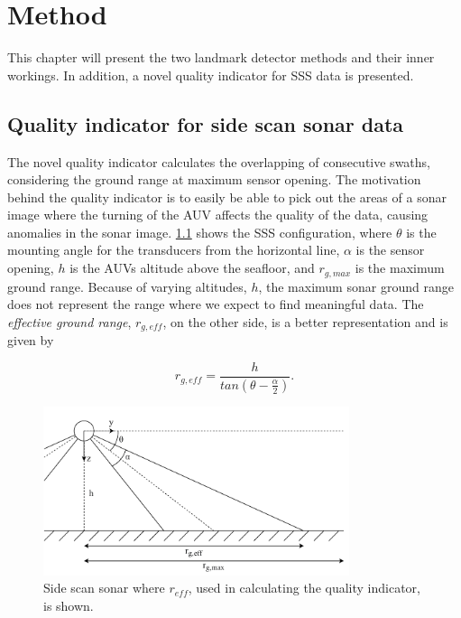 \chapter{Method}

This chapter will present the two landmark detector methods and their inner workings. In addition, a novel quality indicator for SSS data is presented.

\section{Quality indicator for side scan sonar data}

The novel quality indicator calculates the overlapping of consecutive swaths, considering the ground range at maximum sensor opening. The motivation behind the quality indicator is to easily be able to pick out the areas of a sonar image where the turning of the AUV affects the quality of the data, causing anomalies in the sonar image. \cref{fig:r_eff} shows the SSS configuration, where $\theta$ is the mounting angle for the transducers from the horizontal line, $\alpha$ is the sensor opening, $h$ is the AUVs altitude above the seafloor, and $r_{g, max}$ is the maximum ground range. Because of varying altitudes, $h$, the maximum sonar ground range does not represent the range where we expect to find meaningful data. The \textit{effective ground range}, $r_{g, eff}$, on the other side, is a better representation and is given by

\begin{equation}
    r_{g,eff} = \frac{h}{tan(\theta - \frac{\alpha}{2})}.
    \label{eq:r_g_eff}
\end{equation}

\begin{figure}
    \centering
    \includegraphics[width=0.8\textwidth]{figures/r_eff.drawio.pdf}
    \caption{Side scan sonar where $r_{eff}$, used in calculating the quality indicator, is shown.}
    \label{fig:r_eff}
\end{figure}

